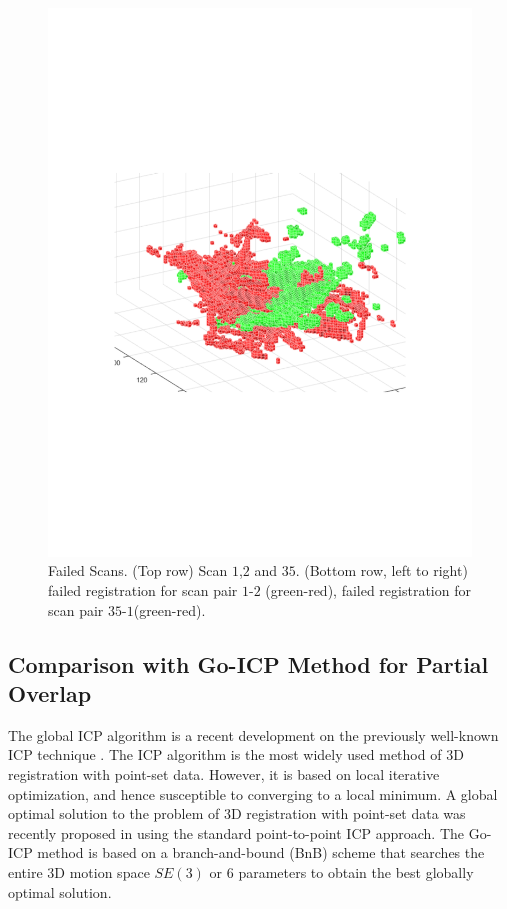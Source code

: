 \documentclass{UCF_ETD}
\begin{document}
\begin{figure}[H]
\begin{center}
\includegraphics[scale=0.48]{RobustRegistration/Scan35-1FailedRegistration}
\caption{ Failed Scans. (Top row) Scan $1$,$2$ and $35$. (Bottom row, left to right) failed registration for scan pair $1$-$2$ (green-red), failed registration for scan pair $35$-$1$(green-red).   }
\label{FailureOfRegistrationScans.fig}
\end{center}
\end{figure}

\subsection{Comparison with Go-ICP Method for Partial Overlap}\label{GoICPExp}
The global ICP algorithm is a recent development on the previously well-known ICP technique \cite{McKay1992}. The ICP algorithm is the most widely used method of $3$D registration with point-set data. However, it is based on local iterative optimization, and hence susceptible to converging to a local minimum. A global optimal solution to the problem of $3$D registration with point-set data was recently proposed in \cite{Jiaolong2016} using the standard point-to-point ICP approach. The Go-ICP method is based on a branch-and-bound (BnB) scheme that searches the entire $3$D motion space $SE(3)$ or $6$ parameters to obtain the best globally optimal solution. 
\end{document}
